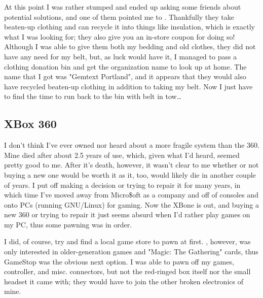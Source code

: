 \documentclass{article}
\begin{document}
At this point I was rather stumped and ended up asking some friends about potential solutions, and one of them pointed me to .  Thankfully they take beaten-up clothing and can recycle it into things like insulation, which is exactly what I was looking for; they also give you an in-store coupon for doing so!  Although I was able to give them both my bedding and old clothes, they did not have any need for my belt, but, as luck would have it, I managed to pass a clothing donation bin and get the organization name to look up at home.  The name that I got was "Gemtext Portland", and it appears that they would also have recycled beaten-up clothing in addition to taking my belt.  Now I just have to find the time to run back to the bin with belt in tow\ldots

\subsection{XBox 360}
I don't think I've ever owned nor heard about a more fragile system than the 360.  Mine died after about 2.5 years of use, which, given what I'd heard, seemed pretty good to me.  After it's death, however, it wasn't clear to me whether or not buying a new one would be worth it as it, too, would likely die in another couple of years.  I put off making a decision or trying to repair it for many years, in which time I've moved away from Micro\$oft as a company and off of consoles and onto PCs (running GNU/Linux) for gaming.  Now the XBone is out, and buying a new 360 or trying to repair it just seems absurd when I'd rather play games on my PC, thus some pawning was in order.

I did, of course, try and find a local game store to pawn at first.  , however, was only interested in older-generation games and "Magic: The Gathering" cards, thus GameStop was the obvious next option.  I was able to pawn off my games, controller, and misc. connectors, but not the red-ringed box itself nor the small headset it came with; they would have to join the other broken electronics of mine.
\end{document}
